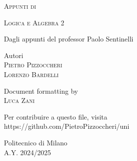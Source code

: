 \documentclass[10pt,a4paper,twoside]{book}
\begin{document}
\frontmatter

\pagestyle{empty}

\hypertarget{mytitlepage}{}

\vspace*{\fill}
\begin{center}
    {\large \textsc{Appunti di}}\\

    \vspace*{0.4cm}

    {\Huge
        \textsc{Logica e Algebra 2}}\\

    \vspace*{1cm}

    {\large Dagli appunti del professor Paolo Sentinelli}\\

    \vspace*{1cm}

    Autori\\
    \vspace*{0.1cm}
    \textsc{Pietro Pizzoccheri}\\
    \textsc{Lorenzo Bardelli}\\

    \vspace*{0.4cm}

    Document formatting by\\
    \vspace*{0.1cm}
    \textsc{Luca Zani}\\

    \vspace*{1cm}

    Per contribuire a questo file, visita\\
    https://github.com/PietroPizzoccheri/uni


    \vspace*{1cm}

    Politecnico di Milano\\A.Y. 2024/2025
\end{center}
\vspace*{\fill}
\clearpage

\hypertarget{mycopyright}{}

\clearpage


% 
\end{document}
